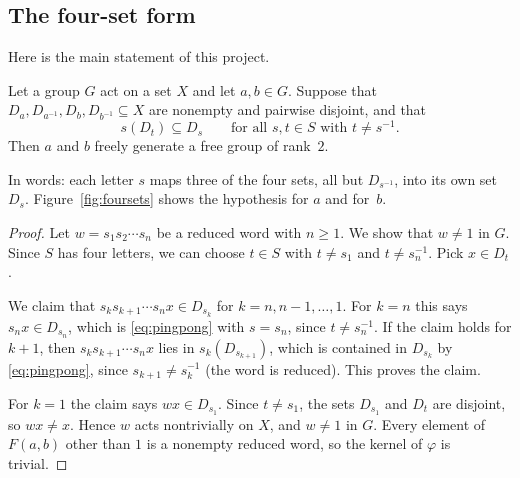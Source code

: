 \subsection{The four-set form}
Here is the main statement of this project.

\begin{theorem}\label{thm:pingpong}
Let a group $G$ act on a set $X$ and let $a, b \in G$. Suppose that
$D_a, D_{a^{-1}}, D_b, D_{b^{-1}} \subseteq X$ are nonempty and pairwise
disjoint, and that
\begin{equation}\label{eq:pingpong}
  s(D_t) \subseteq D_s \qquad \text{for all } s, t \in S \text{ with } t \ne s^{-1}.
\end{equation}
Then $a$ and $b$ freely generate a free group of rank~$2$.
\end{theorem}

In words: each letter $s$ maps three of the four sets, all but $D_{s^{-1}}$,
into its own set $D_s$. Figure~\ref{fig:foursets} shows the hypothesis for $a$
and for~$b$.

\begin{proof}
Let $w = s_1 s_2 \cdots s_n$ be a reduced word with $n \ge 1$. We show that
$w \ne 1$ in $G$. Since $S$ has four letters, we can choose $t \in S$ with
$t \ne s_1$ and $t \ne s_n^{-1}$. Pick $x \in D_t$.

We claim that $s_k s_{k+1} \cdots s_n x \in D_{s_k}$ for $k = n, n-1, \dots, 1$.
For $k = n$ this says $s_n x \in D_{s_n}$, which is \eqref{eq:pingpong} with
$s = s_n$, since $t \ne s_n^{-1}$. If the claim holds for $k+1$, then
$s_k s_{k+1} \cdots s_n x$ lies in $s_k(D_{s_{k+1}})$, which is contained in
$D_{s_k}$ by \eqref{eq:pingpong}, since $s_{k+1} \ne s_k^{-1}$ (the word is
reduced). This proves the claim.

For $k = 1$ the claim says $wx \in D_{s_1}$. Since $t \ne s_1$, the sets
$D_{s_1}$ and $D_t$ are disjoint, so $wx \ne x$. Hence $w$ acts nontrivially
on $X$, and $w \ne 1$ in $G$. Every element of $F(a,b)$ other than $1$ is a
nonempty reduced word, so the kernel of $\varphi$ is trivial.
\end{proof}

